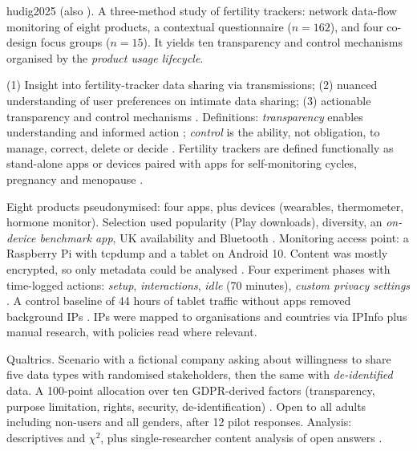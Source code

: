 \begin{papercard}{hudig2025}
    (also ). A three-method study of fertility trackers: network data-flow monitoring of eight products, a contextual questionnaire ($n=162$), and four co-design focus groups ($n=15$). It yields ten transparency and control mechanisms organised by the \emph{product usage lifecycle}.

 (1) Insight into fertility-tracker data sharing via transmissions; (2) nuanced understanding of user preferences on intimate data sharing; (3) actionable transparency and control mechanisms . Definitions: \emph{transparency} enables understanding and informed action ; \emph{control} is the ability, not obligation, to manage, correct, delete or decide . Fertility trackers are defined functionally as stand-alone apps or devices paired with apps for self-monitoring cycles, pregnancy and menopause .

 Eight products pseudonymised: four apps, plus devices (wearables, thermometer, hormone monitor). Selection used popularity (Play downloads), diversity, an \emph{on-device benchmark app}, UK availability and Bluetooth . Monitoring access point: a Raspberry Pi with tcpdump and a tablet on Android 10. Content was mostly encrypted, so only metadata could be analysed . Four experiment phases with time-logged actions: \emph{setup}, \emph{interactions}, \emph{idle} (70 minutes), \emph{custom privacy settings} . A control baseline of 44 hours of tablet traffic without apps removed background IPs . IPs were mapped to organisations and countries via IPInfo plus manual research, with policies read where relevant.

 Qualtrics. Scenario with a fictional company asking about willingness to share five data types with randomised stakeholders, then the same with \emph{de-identified} data. A 100-point allocation over ten GDPR-derived factors (transparency, purpose limitation, rights, security, de-identification) . Open to all adults including non-users and all genders, after 12 pilot responses. Analysis: descriptives and $\chi^2$, plus single-researcher content analysis of open answers .


\end{papercard}
